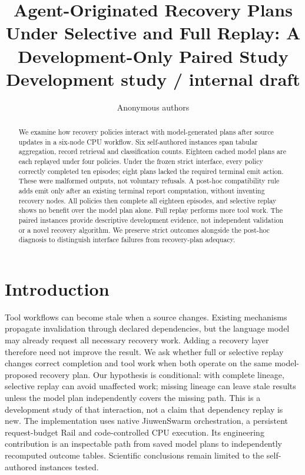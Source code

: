 \documentclass{article}
\title{Agent-Originated Recovery Plans Under Selective and Full Replay: A Development-Only Paired Study\\[0.4em]{\small Development study / internal draft}}
\author{Anonymous authors}
\begin{document}
\maketitle


\begin{abstract}

We examine how recovery policies interact with model-generated plans after source updates in a six-node CPU workflow. Six self-authored instances span tabular aggregation, record retrieval and classification counts. Eighteen cached model plans are each replayed under four policies. Under the frozen strict interface, every policy correctly completed ten episodes; eight plans lacked the required terminal emit action. These were malformed outputs, not voluntary refusals. A post-hoc compatibility rule adds emit only after an existing terminal report computation, without inventing recovery nodes. All policies then complete all eighteen episodes, and selective replay shows no benefit over the model plan alone. Full replay performs more tool work. The paired instances provide descriptive development evidence, not independent validation or a novel recovery algorithm. We preserve strict outcomes alongside the post-hoc diagnosis to distinguish interface failures from recovery-plan adequacy.

\end{abstract}

\section{Introduction}

Tool workflows can become stale when a source changes. Existing mechanisms propagate invalidation through declared dependencies, but the language model may already request all necessary recovery work. Adding a recovery layer therefore need not improve the result. We ask whether full or selective replay changes correct completion and tool work when both operate on the same model-proposed recovery plan. Our hypothesis is conditional: with complete lineage, selective replay can avoid unaffected work; missing lineage can leave stale results unless the model plan independently covers the missing path. This is a development study of that interaction, not a claim that dependency replay is new. The implementation uses native JiuwenSwarm orchestration, a persistent request-budget Rail and code-controlled CPU execution. Its engineering contribution is an inspectable path from saved model plans to independently recomputed outcome tables. Scientific conclusions remain limited to the self-authored instances tested.
\end{document}
